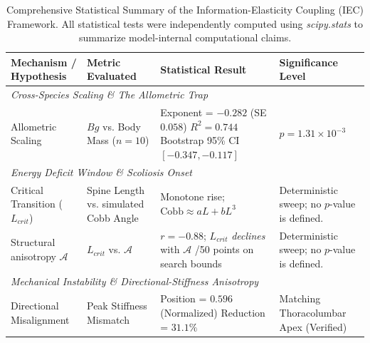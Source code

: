 \begin{table}[h!]
\centering
\caption{Comprehensive Statistical Summary of the Information-Elasticity Coupling (IEC) Framework. All statistical tests were independently computed using \textit{scipy.stats} to summarize model-internal computational claims.}
\label{tab:statistical_summary}
\scriptsize
\begin{tabular}{p{3.5cm}p{3cm}p{4cm}p{3.5cm}}
\toprule
\textbf{Mechanism / Hypothesis} & \textbf{Metric Evaluated} & \textbf{Statistical Result} & \textbf{Significance Level} \\
\midrule
\multicolumn{4}{l}{\textit{Cross-Species Scaling \& The Allometric Trap}} \\
Allometric Scaling & $Bg$ vs. Body Mass ($n=10$) & Exponent = $-0.282$ (SE $0.058$) \newline $R^2 = 0.744$ \newline Bootstrap 95\% CI $[-0.347, -0.117]$ & $p = 1.31 \times 10^{-3}$ \\
\midrule
\multicolumn{4}{l}{\textit{Energy Deficit Window \& Scoliosis Onset}} \\
Critical Transition ($L_{crit}$) & Spine Length vs. simulated Cobb Angle & Monotone rise; $\mathrm{Cobb} \approx aL + bL^3$ & Deterministic sweep; no $p$-value is defined. \\
Structural anisotropy $\mathcal{A}$ & $L_{crit}$ vs. $\mathcal{A}$ & $r = -0.88$; $L_{crit}$ \emph{declines} with $\mathcal{A}$ \newline 20/50 points on search bounds & Deterministic sweep; no $p$-value is defined. \\
\midrule
\multicolumn{4}{l}{\textit{Mechanical Instability \& Directional-Stiffness Anisotropy}} \\
Directional Misalignment & Peak Stiffness Mismatch & Position = $0.596$ (Normalized) \newline Reduction = $31.1\%$ & Matching Thoracolumbar Apex (Verified) \\
\bottomrule
\end{tabular}
\end{table}
